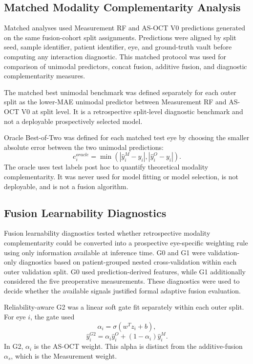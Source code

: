 \documentclass[10pt,twocolumn]{article}
\begin{document}
\subsection{Matched Modality Complementarity Analysis}

Matched analyses used Measurement RF and AS-OCT V0 predictions generated on the same fusion-cohort split assignments. Predictions were aligned by split seed, sample identifier, patient identifier, eye, and ground-truth vault before computing any interaction diagnostic. This matched protocol was used for comparison of unimodal predictors, concat fusion, additive fusion, and diagnostic complementarity measures.

The matched best unimodal benchmark was defined separately for each outer split as the lower-MAE unimodal predictor between Measurement RF and AS-OCT V0 at split level. It is a retrospective split-level diagnostic benchmark and not a deployable prospectively selected model.

Oracle Best-of-Two was defined for each matched test eye by choosing the smaller absolute error between the two unimodal predictions:
\begin{equation}
e_i^{oracle}
=
\min \left(
|\hat{y}_i^{M}-y_i|,
|\hat{y}_i^{O}-y_i|
\right).
\end{equation}
The oracle uses test labels post hoc to quantify theoretical modality complementarity. It was never used for model fitting or model selection, is not deployable, and is not a fusion algorithm.

\subsection{Fusion Learnability Diagnostics}

Fusion learnability diagnostics tested whether retrospective modality complementarity could be converted into a prospective eye-specific weighting rule using only information available at inference time. G0 and G1 were validation-only diagnostics based on patient-grouped nested cross-validation within each outer validation split. G0 used prediction-derived features, while G1 additionally considered the five preoperative measurements. These diagnostics were used to decide whether the available signals justified formal adaptive fusion evaluation.

Reliability-aware G2 was a linear soft gate fit separately within each outer split. For eye $i$, the gate used
\begin{equation}
\alpha_i=\sigma(w^T z_i+b),
\end{equation}
\begin{equation}
\hat{y}_i^{G2}
=
\alpha_i \hat{y}_i^{O}
+
(1-\alpha_i)\hat{y}_i^{M}.
\end{equation}
In G2, $\alpha_i$ is the AS-OCT weight. This alpha is distinct from the additive-fusion $\alpha_s$, which is the Measurement weight.
\end{document}
